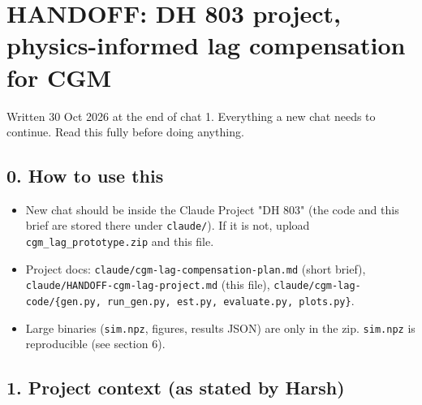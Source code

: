\documentclass[11pt,a4paper]{article}
\providecommand{\tightlist}{\setlength{\itemsep}{0pt}\setlength{\parskip}{0pt}}
\begin{document}
\hypertarget{handoff-dh-803-project-physics-informed-lag-compensation-for-cgm}{%
\section{HANDOFF: DH 803 project, physics-informed lag compensation for
CGM}\label{handoff-dh-803-project-physics-informed-lag-compensation-for-cgm}}

Written 30 Oct 2026 at the end of chat 1. Everything a new chat needs to
continue. Read this fully before doing anything.

\hypertarget{0-how-to-use-this}{%
\subsection{0. How to use this}\label{0-how-to-use-this}}

\begin{itemize}
\tightlist
\item
  New chat should be inside the Claude Project "DH 803" (the code and
  this brief are stored there under \texttt{claude/}). If it is not,
  upload \texttt{cgm\_lag\_prototype.zip} and this file.
\item
  Project docs: \texttt{claude/cgm-lag-compensation-plan.md} (short
  brief), \texttt{claude/HANDOFF-cgm-lag-project.md} (this file),
  \texttt{claude/cgm-lag-code/\{gen.py,\ run\_gen.py,\ est.py,\ evaluate.py,\ plots.py\}}.
\item
  Large binaries (\texttt{sim.npz}, figures, results JSON) are only in
  the zip. \texttt{sim.npz} is reproducible (see section 6).
\end{itemize}

\hypertarget{1-project-context-as-stated-by-harsh}{%
\subsection{1. Project context (as stated by
Harsh)}\label{1-project-context-as-stated-by-harsh}}
\end{document}
